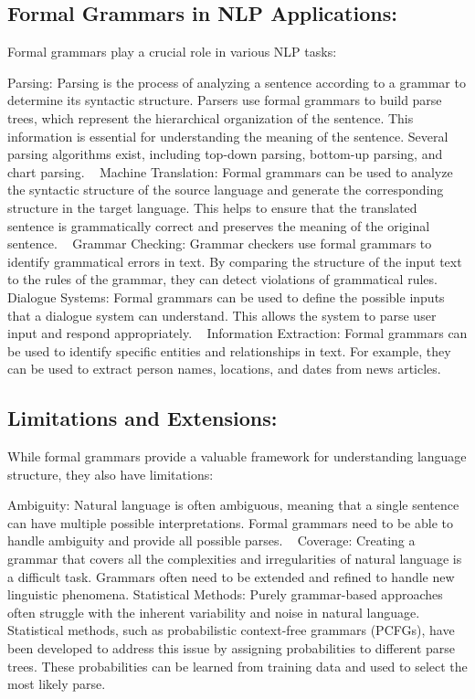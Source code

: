 	\subsection{Formal Grammars in NLP Applications:}
	
	Formal grammars play a crucial role in various NLP tasks:
	
	Parsing: Parsing is the process of analyzing a sentence according to a grammar to determine its syntactic structure. Parsers use formal grammars to build parse trees, which represent the hierarchical organization of the sentence. This information is essential for understanding the meaning of the sentence. Several parsing algorithms exist, including top-down parsing, bottom-up parsing, and chart parsing.   
	Machine Translation: Formal grammars can be used to analyze the syntactic structure of the source language and generate the corresponding structure in the target language. This helps to ensure that the translated sentence is grammatically correct and preserves the meaning of the original sentence.   
	Grammar Checking: Grammar checkers use formal grammars to identify grammatical errors in text. By comparing the structure of the input text to the rules of the grammar, they can detect violations of grammatical rules.   
	Dialogue Systems: Formal grammars can be used to define the possible inputs that a dialogue system can understand. This allows the system to parse user input and respond appropriately.   
	Information Extraction: Formal grammars can be used to identify specific entities and relationships in text. For example, they can be used to extract person names, locations, and dates from news articles.   
	
	\subsection{Limitations and Extensions:}
	
	While formal grammars provide a valuable framework for understanding language structure, they also have limitations:
	
	Ambiguity: Natural language is often ambiguous, meaning that a single sentence can have multiple possible interpretations. Formal grammars need to be able to handle ambiguity and provide all possible parses.   
	Coverage: Creating a grammar that covers all the complexities and irregularities of natural language is a difficult task. Grammars often need to be extended and refined to handle new linguistic phenomena.
	Statistical Methods: Purely grammar-based approaches often struggle with the inherent variability and noise in natural language. Statistical methods, such as probabilistic context-free grammars (PCFGs), have been developed to address this issue by assigning probabilities to different parse trees. These probabilities can be learned from training data and used to select the most likely parse.   
	
	

